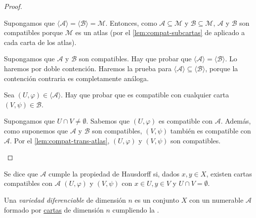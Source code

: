 \documentclass[\main/VD_completo.tex]{subfiles}
\begin{document}
\begin{proof} \item
  \begin{subproof}[\(\implies\)]
    Supongamos que \(\langle \mathcal{A} \rangle = \langle \mathcal{B} \rangle = \mathcal{M}\). Entonces, como
    \(\mathcal{A} \subseteq \mathcal{M}\) y \(\mathcal{B} \subseteq \mathcal{M}\), \(\mathcal{A}\) y
    \(\mathcal{B}\) son compatibles porque \(\mathcal{M}\) es un atlas (por el
    \cref{lem:compat-subcartas} de  aplicado a
    cada carta de los atlas).
  \end{subproof}

  \begin{subproof}[\(\impliedby\)]
    Supongamos que \(\mathcal{A}\) y \(\mathcal{B}\) son compatibles. Hay que
    probar que \(\langle \mathcal{A} \rangle = \langle \mathcal{B} \rangle\). Lo
    haremos por doble contención. Haremos la prueba para \(\langle \mathcal{A}
    \rangle \subseteq \langle \mathcal{B} \rangle\), porque la contención
    contraria es completamente análoga.

    Sea \((U, \varphi) \in
    \langle \mathcal{A} \rangle\). Hay que probar que es compatible con
    cualquier carta \((V,\psi) \in \mathcal{B}\).

      Supongamos que \(U \cap V \neq \emptyset\). Sabemos que
      \((U,\varphi)\) es compatible con \(\mathcal{A}\). Además, como suponemos
      que \(\mathcal{A}\) y \(\mathcal{B}\) son compatibles, \((V,\psi)\)
      también es compatible con \(\mathcal{A}\). Por el
      \cref{lem:compat-trans-atlas}, \((U,\varphi)\) y \((V,\psi)\) son
      compatibles.
  \end{subproof}
\end{proof}

\begin{definition}[name={propiedad de Hausdorff}, label={def:Hausdorff}]
  Se dice que \(\mathcal{A}\) cumple la propiedad de Hausdorff si, dados \(x,y
  \in X\), existen cartas compatibles con \(\mathcal{A}\) \((U, \varphi)\) y
  \((V, \psi)\) con \(x \in U, y \in V\) y \(U \cap V = \emptyset\).
\end{definition}

\begin{definition}[name={variedad},label={def:vd}]
  Una \emph{variedad diferenciable} de dimensión \(n\) es un conjunto \(X\) con
  un  numerable \(\mathcal{A}\) formado por
  \hyperref[def:carta]{cartas} de dimensión \(n\) cumpliendo la
  .
\end{definition}
\end{document}
